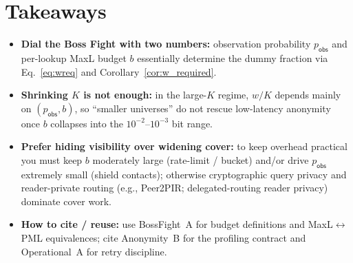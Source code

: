 \documentclass[11pt]{article}
\begin{document}
\section{Takeaways}
\begin{itemize}[leftmargin=*]
\item \textbf{Dial the Boss Fight with two numbers:} observation probability $p_{\mathsf{obs}}$ and per-lookup MaxL budget $b$ essentially determine the dummy fraction via Eq.~\eqref{eq:wreq} and Corollary~\ref{cor:w_required}.
\item \textbf{Shrinking $K$ is not enough:} in the large-$K$ regime, $w/K$ depends mainly on $(p_{\mathsf{obs}},b)$, so ``smaller universes'' do not rescue low-latency anonymity once $b$ collapses into the $10^{-2}$--$10^{-3}$ bit range.
\item \textbf{Prefer hiding visibility over widening cover:} to keep overhead practical you must keep $b$ moderately large (rate-limit / bucket) and/or drive $p_{\mathsf{obs}}$ extremely small (shield contacts); otherwise cryptographic query privacy and reader-private routing (e.g., Peer2PIR; delegated-routing reader privacy) dominate cover work.
\item \textbf{How to cite / reuse:} use BossFight~A for budget definitions and MaxL$\leftrightarrow$PML equivalences; cite Anonymity~B for the profiling contract and Operational~A for retry discipline.
\end{itemize}
\end{document}
